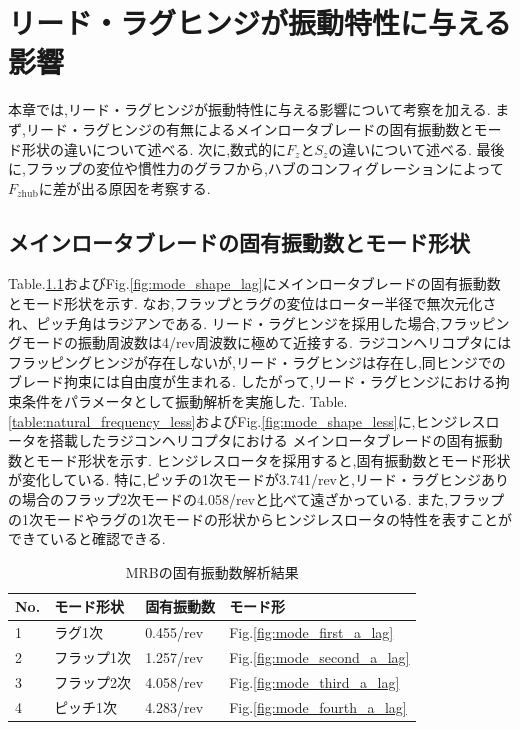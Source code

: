 \chapter{リード・ラグヒンジが振動特性に与える影響}
\label{chap:leadlag}
\begin{flushright}
	\begin{minipage}{0.8\hsize}
		\quad 本章では,リード・ラグヒンジが振動特性に与える影響について考察を加える.
		      まず,リード・ラグヒンジの有無によるメインロータブレードの固有振動数とモード形状の違いについて述べる.
			  次に,数式的に$F_z$と$S_z$の違いについて述べる.
              最後に,フラップの変位や慣性力のグラフから,ハブのコンフィグレーションによって$F_{z\mathrm{hub}}$に差が出る原因を考察する.
	\end{minipage}
\end{flushright}

    \section{メインロータブレードの固有振動数とモード形状}
    \label{sec:natural_frequency_mode}
    \par
    Table.\ref{table:natural_frequency}およびFig.\ref{fig:mode_shape_lag}にメインロータブレードの固有振動数とモード形状を示す.
    なお,フラップとラグの変位はローター半径で無次元化され、ピッチ角はラジアンである.
    リード・ラグヒンジを採用した場合,フラッピングモードの振動周波数は4/rev周波数に極めて近接する.
    ラジコンヘリコプタにはフラッピングヒンジが存在しないが,リード・ラグヒンジは存在し,同ヒンジでのブレード拘束には自由度が生まれる.
    したがって,リード・ラグヒンジにおける拘束条件をパラメータとして振動解析を実施した.
    Table.\ref{table:natural_frequency_less}およびFig.\ref{fig:mode_shape_less}に,ヒンジレスロータを搭載したラジコンヘリコプタにおける
    メインロータブレードの固有振動数とモード形状を示す.
    ヒンジレスロータを採用すると,固有振動数とモード形状が変化している. 
    特に,ピッチの1次モードが3.741/revと,リード・ラグヒンジありの場合のフラップ2次モードの4.058/revと比べて遠ざかっている.
    また,フラップの1次モードやラグの1次モードの形状からヒンジレスロータの特性を表すことができていると確認できる.


    \clearpage
    \begin{table}[H]
        \centering
        \caption{MRBの固有振動数解析結果}
        \label{table:natural_frequency}
        \setlength{\tabcolsep}{5pt}
        \begin{tabular}{|l|l|l|l|}
            \hline No. &   モード形状   &   固有振動数    &  モード形     \\
            \hline 1   &   ラグ1次      &   0.455/rev    &  Fig.\ref{fig:mode_first_a_lag}   \\
            \hline 2   &   フラップ1次  &   1.257/rev    &  Fig.\ref{fig:mode_second_a_lag}    \\
            \hline 3   &   フラップ2次  &   4.058/rev    &  Fig.\ref{fig:mode_third_a_lag}   \\
            \hline 4   &   ピッチ1次    &   4.283/rev    &  Fig.\ref{fig:mode_fourth_a_lag}    \\
            \hline 
        \end{tabular}
    \end{table}

